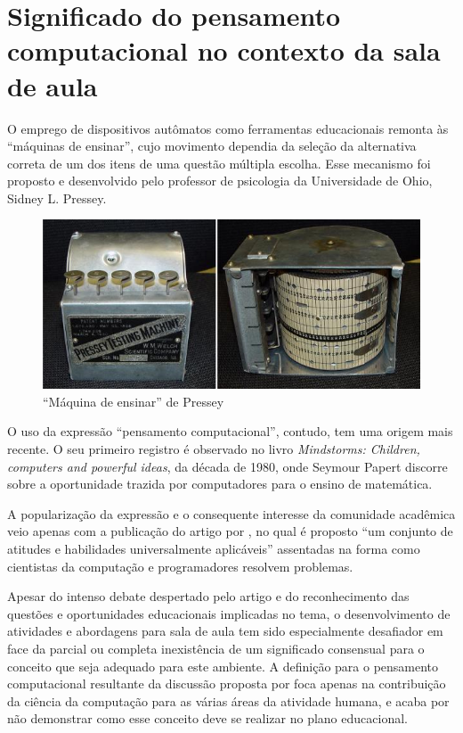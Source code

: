 \section{Significado do pensamento computacional no contexto da sala de aula}\label{significado-pensamento-computacional}

O emprego de dispositivos autômatos como ferramentas educacionais remonta às ``máquinas de ensinar'', cujo movimento dependia da seleção da alternativa correta de um dos itens de uma questão múltipla escolha. Esse mecanismo foi proposto e desenvolvido pelo professor de psicologia da Universidade de Ohio,  Sidney L. Pressey.

\begin{figure}[!htb]
	\caption{``Máquina de ensinar'' de Pressey}
	\begin{center}
	    \includegraphics[scale=0.7]{imagens/pressey}
	\end{center}
	\label{fig:pressey}
\end{figure}

O uso da expressão ``pensamento computacional'', contudo, tem uma origem mais recente. O seu primeiro registro é observado no livro \textit{Mindstorms: Children, computers and powerful ideas}, da década de 1980, onde Seymour Papert discorre sobre a oportunidade trazida por computadores para o ensino de matemática. 

A popularização da expressão e o consequente interesse da comunidade acadêmica veio apenas com a publicação do artigo por , no qual é proposto ``um conjunto de atitudes e habilidades universalmente aplicáveis'' assentadas na forma como cientistas da computação e programadores resolvem problemas.

Apesar do intenso debate despertado pelo artigo e do reconhecimento das questões e oportunidades educacionais implicadas no tema, o desenvolvimento de atividades e abordagens para sala de aula tem sido especialmente desafiador em face da parcial ou completa inexistência de um significado consensual para o conceito que seja adequado para este ambiente. A definição para o pensamento computacional resultante da discussão proposta por  foca apenas na contribuição da ciência da computação para as várias áreas da atividade humana, e acaba por não demonstrar como esse conceito deve se realizar no plano educacional.


